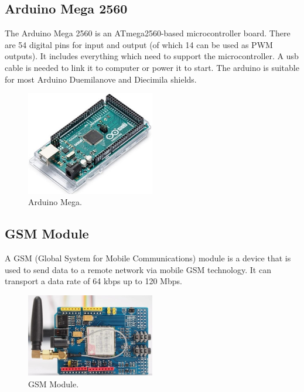 \subsection{Arduino Mega 2560}
The Arduino Mega 2560 is an ATmega2560-based microcontroller board. There are 54 digital pins for input and output (of which 14 can be used as PWM outputs). It includes everything which need to support the microcontroller. A usb cable is needed to link it to computer or power it to start. The arduino is suitable for most Arduino Duemilanove and Diecimila shields.
\begin{figure}[H]
\centering
\includegraphics[width=0.5\textwidth]{figures/Arduino Mega.jpg}
\caption{Arduino Mega.}
\label{Arduino Mega}
\end{figure}
\subsection{GSM Module}
A GSM (Global System for Mobile Communications) module is a device that is used to send data to a remote network via mobile GSM technology. It can transport a data rate of 64 kbps up to 120 Mbps.
\begin{figure}[H]
\centering
\includegraphics[width=0.5\textwidth]{figures/GSM Shield with Arduino.jpg}
\caption{GSM Module.}
\label{GSM module}
\end{figure}
